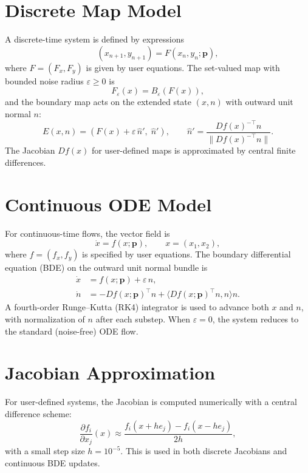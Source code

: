 \documentclass[11pt]{article}
\begin{document}
\section{Discrete Map Model}
A discrete-time system is defined by expressions
\begin{equation}
(x_{n+1}, y_{n+1}) = F(x_n, y_n; \mathbf{p}),
\end{equation}
where $F = (F_x, F_y)$ is given by user equations. The set-valued map with bounded noise radius $\varepsilon \ge 0$ is
\begin{equation}
F_{\varepsilon}(x) = B_{\varepsilon}(F(x)),
\end{equation}
and the boundary map acts on the extended state $(x, n)$ with outward unit normal $n$:
\begin{equation}
E(x, n) = \left(F(x) + \varepsilon\, \hat{n}',\; \hat{n}'\right), \qquad
\hat{n}' = \frac{Df(x)^{-\top} n}{\|Df(x)^{-\top} n\|}.
\end{equation}
The Jacobian $Df(x)$ for user-defined maps is approximated by central finite differences.

\section{Continuous ODE Model}
For continuous-time flows, the vector field is
\begin{equation}
\dot{x} = f(x; \mathbf{p}), \qquad x=(x_1, x_2),
\end{equation}
where $f = (f_x, f_y)$ is specified by user equations. The boundary differential equation (BDE) on the outward unit normal bundle is
\begin{align}
\dot{x} &= f(x; \mathbf{p}) + \varepsilon\, n,\\
\dot{n} &= -Df(x; \mathbf{p})^{\top} n + \bigl\langle Df(x; \mathbf{p})^{\top} n, n \bigr\rangle n.
\end{align}
A fourth-order Runge--Kutta (RK4) integrator is used to advance both $x$ and $n$, with normalization of $n$ after each substep. When $\varepsilon = 0$, the system reduces to the standard (noise-free) ODE flow.

\section{Jacobian Approximation}
For user-defined systems, the Jacobian is computed numerically with a central difference scheme:
\begin{equation}
\frac{\partial f_i}{\partial x_j}(x) \approx
\frac{f_i(x + h e_j) - f_i(x - h e_j)}{2h},
\end{equation}
with a small step size $h = 10^{-5}$. This is used in both discrete Jacobians and continuous BDE updates.
\end{document}
